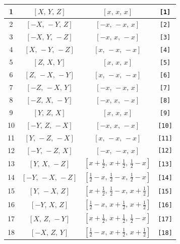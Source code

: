 \documentclass[fleqn,8pt]{jsarticle}
\begin{document}
\begin{longtable}{cccc}
1 & $\left[ X,\, Y,\, Z \right]$ & $\left[ x,\, x,\, x \right]$ & {\tt [1]} \\ \hline
2 & $\left[ - X,\, - Y,\, Z \right]$ & $\left[ - x,\, - x,\, x \right]$ & {\tt [2]} \\ \hline
3 & $\left[ - X,\, Y,\, - Z \right]$ & $\left[ - x,\, x,\, - x \right]$ & {\tt [3]} \\ \hline
4 & $\left[ X,\, - Y,\, - Z \right]$ & $\left[ x,\, - x,\, - x \right]$ & {\tt [4]} \\ \hline
5 & $\left[ Z,\, X,\, Y \right]$ & $\left[ x,\, x,\, x \right]$ & {\tt [5]} \\ \hline
6 & $\left[ Z,\, - X,\, - Y \right]$ & $\left[ x,\, - x,\, - x \right]$ & {\tt [6]} \\ \hline
7 & $\left[ - Z,\, - X,\, Y \right]$ & $\left[ - x,\, - x,\, x \right]$ & {\tt [7]} \\ \hline
8 & $\left[ - Z,\, X,\, - Y \right]$ & $\left[ - x,\, x,\, - x \right]$ & {\tt [8]} \\ \hline
9 & $\left[ Y,\, Z,\, X \right]$ & $\left[ x,\, x,\, x \right]$ & {\tt [9]} \\ \hline
10 & $\left[ - Y,\, Z,\, - X \right]$ & $\left[ - x,\, x,\, - x \right]$ & {\tt [10]} \\ \hline
11 & $\left[ Y,\, - Z,\, - X \right]$ & $\left[ x,\, - x,\, - x \right]$ & {\tt [11]} \\ \hline
12 & $\left[ - Y,\, - Z,\, X \right]$ & $\left[ - x,\, - x,\, x \right]$ & {\tt [12]} \\ \hline
13 & $\left[ Y,\, X,\, - Z \right]$ & $\left[ x + \frac{1}{2},\, x + \frac{1}{2},\, \frac{1}{2} - x \right]$ & {\tt [13]} \\ \hline
14 & $\left[ - Y,\, - X,\, - Z \right]$ & $\left[ \frac{1}{2} - x,\, \frac{1}{2} - x,\, \frac{1}{2} - x \right]$ & {\tt [14]} \\ \hline
15 & $\left[ Y,\, - X,\, Z \right]$ & $\left[ x + \frac{1}{2},\, \frac{1}{2} - x,\, x + \frac{1}{2} \right]$ & {\tt [15]} \\ \hline
16 & $\left[ - Y,\, X,\, Z \right]$ & $\left[ \frac{1}{2} - x,\, x + \frac{1}{2},\, x + \frac{1}{2} \right]$ & {\tt [16]} \\ \hline
17 & $\left[ X,\, Z,\, - Y \right]$ & $\left[ x + \frac{1}{2},\, x + \frac{1}{2},\, \frac{1}{2} - x \right]$ & {\tt [17]} \\ \hline
18 & $\left[ - X,\, Z,\, Y \right]$ & $\left[ \frac{1}{2} - x,\, x + \frac{1}{2},\, x + \frac{1}{2} \right]$ & {\tt [18]} \\ \hline

\end{longtable}
\end{document}
